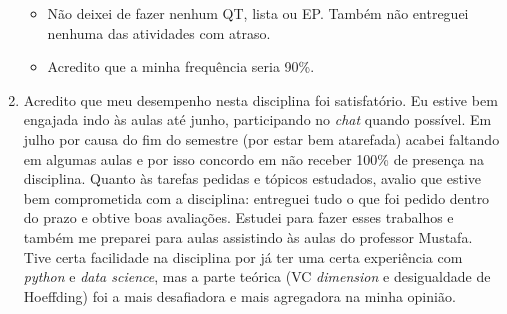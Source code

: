 \documentclass[a4paper,11pt]{article}
\begin{document}
\begin{enumerate}
\begin{itemize}
                \item Não deixei de fazer nenhum QT, lista ou EP. Também não entreguei nenhuma das atividades com atraso.
                
                \item Acredito que a minha frequência seria 90\%.
            \end{itemize}
        
        \item Acredito que meu desempenho nesta disciplina foi satisfatório. Eu estive bem engajada indo às aulas até junho, participando no \textit{chat} quando possível. Em julho por causa do fim do semestre (por estar bem atarefada) acabei faltando em algumas aulas e por isso concordo em não receber 100\% de presença na disciplina. Quanto às tarefas pedidas e tópicos estudados, avalio que estive bem comprometida com a disciplina: entreguei tudo o que foi pedido dentro do prazo e obtive boas avaliações. Estudei para fazer esses trabalhos e também me preparei para aulas assistindo às aulas do professor Mustafa. Tive certa facilidade na disciplina por já ter uma certa experiência com \textit{python} e \textit{data science}, mas a parte teórica (VC \textit{dimension} e desigualdade de Hoeffding) foi a mais desafiadora e mais agregadora na minha opinião.

    \end{enumerate}
\end{document}
